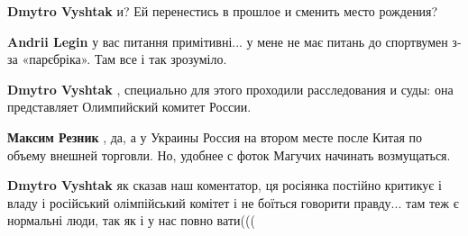 \begin{itemize}
\begin{itemize}
\begin{itemize}
 
\textbf{Dmytro Vyshtak} и? Ей перенестись в прошлое и сменить место рождения?

 
\textbf{Andrii Legin} у вас питання примітивні... у мене не має питань до спортвумен з-за «парєбріка». Там все і так зрозуміло.

 
\textbf{Dmytro Vyshtak} , специально для этого проходили расследования и суды: она представляет Олимпийский комитет России.

 
\textbf{Максим Резник} , да, а у Украины Россия на втором месте после Китая по объему внешней торговли. Но, удобнее с фоток Магучих начинать возмущаться.
\end{itemize}

 
\textbf{Dmytro Vyshtak} як сказав наш коментатор, ця росіянка постійно критикує
і владу і російський олімпійський комітет і не боїться говорити правду... там теж
є нормальні люди, так як і у нас повно вати(((

\begin{itemize}
 

\end{itemize}
\end{itemize}
\end{itemize}
